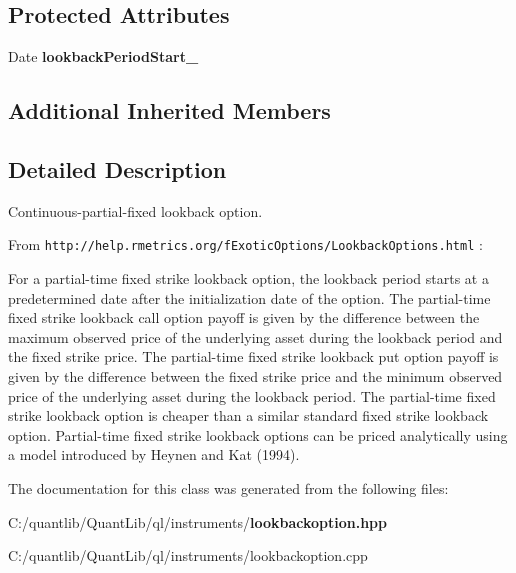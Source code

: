 \subsection*{Protected Attributes}
\begin{DoxyCompactItemize}
\item 
Date {\bfseries lookback\+Period\+Start\+\_\+}\label{class_quant_lib_1_1_continuous_partial_fixed_lookback_option_aa389dc2860ab4b57d596f84f103b3242}

\end{DoxyCompactItemize}
\subsection*{Additional Inherited Members}


\subsection{Detailed Description}
Continuous-\/partial-\/fixed lookback option. 

From {\tt http\+://help.\+rmetrics.\+org/f\+Exotic\+Options/\+Lookback\+Options.\+html} \+:

For a partial-\/time fixed strike lookback option, the lookback period starts at a predetermined date after the initialization date of the option. The partial-\/time fixed strike lookback call option payoff is given by the difference between the maximum observed price of the underlying asset during the lookback period and the fixed strike price. The partial-\/time fixed strike lookback put option payoff is given by the difference between the fixed strike price and the minimum observed price of the underlying asset during the lookback period. The partial-\/time fixed strike lookback option is cheaper than a similar standard fixed strike lookback option. Partial-\/time fixed strike lookback options can be priced analytically using a model introduced by Heynen and Kat (1994). 

The documentation for this class was generated from the following files\+:\begin{DoxyCompactItemize}
\item 
C\+:/quantlib/\+Quant\+Lib/ql/instruments/{\bf lookbackoption.\+hpp}\item 
C\+:/quantlib/\+Quant\+Lib/ql/instruments/lookbackoption.\+cpp\end{DoxyCompactItemize}
